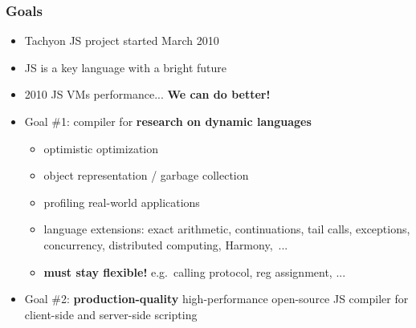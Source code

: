 \begin{frame}
\frametitle{\bf Goals}

  \begin{itemize}

  \item Tachyon JS project started March 2010
    \smallskip

  \item JS is a key language with a bright future
    \smallskip

  \item 2010 JS VMs performance... {\bf We can do better!}
    \smallskip

    \bigskip

  \item Goal \#1: compiler for {\bf research on dynamic languages}
    \begin{itemize}
    \item optimistic optimization
    \item object representation / garbage collection
    \item profiling real-world applications
    \item language extensions: exact arithmetic, continuations, tail calls, exceptions, concurrency, distributed computing, Harmony,~...
    \item {\bf must stay flexible!} e.g.~calling protocol, reg assignment, ...
    \end{itemize}
    \smallskip

  \item Goal \#2: {\bf production-quality} high-performance open-source
    JS compiler for client-side and server-side scripting

  \end{itemize}

\end{frame}

